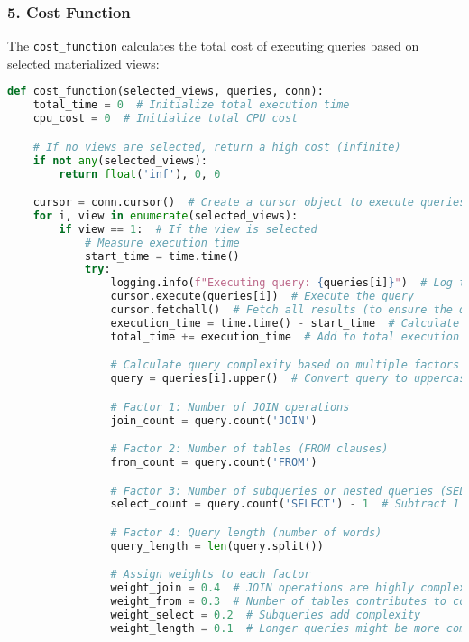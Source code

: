 \subsubsection*{5. Cost Function}
The \texttt{cost\_function} calculates the total cost of executing queries based on selected materialized views:
\begin{lstlisting}[language=Python]
def cost_function(selected_views, queries, conn):
    total_time = 0  # Initialize total execution time
    cpu_cost = 0  # Initialize total CPU cost

    # If no views are selected, return a high cost (infinite)
    if not any(selected_views):
        return float('inf'), 0, 0

    cursor = conn.cursor()  # Create a cursor object to execute queries
    for i, view in enumerate(selected_views):
        if view == 1:  # If the view is selected
            # Measure execution time
            start_time = time.time()
            try:
                logging.info(f"Executing query: {queries[i]}")  # Log the query being executed
                cursor.execute(queries[i])  # Execute the query
                cursor.fetchall()  # Fetch all results (to ensure the query runs completely)
                execution_time = time.time() - start_time  # Calculate execution time
                total_time += execution_time  # Add to total execution time

                # Calculate query complexity based on multiple factors
                query = queries[i].upper()  # Convert query to uppercase for case-insensitive matching

                # Factor 1: Number of JOIN operations
                join_count = query.count('JOIN')

                # Factor 2: Number of tables (FROM clauses)
                from_count = query.count('FROM')

                # Factor 3: Number of subqueries or nested queries (SELECT clauses)
                select_count = query.count('SELECT') - 1  # Subtract 1 for the main SELECT

                # Factor 4: Query length (number of words)
                query_length = len(query.split())

                # Assign weights to each factor
                weight_join = 0.4  # JOIN operations are highly complex
                weight_from = 0.3  # Number of tables contributes to complexity
                weight_select = 0.2  # Subqueries add complexity
                weight_length = 0.1  # Longer queries might be more complex


\end{lstlisting}
